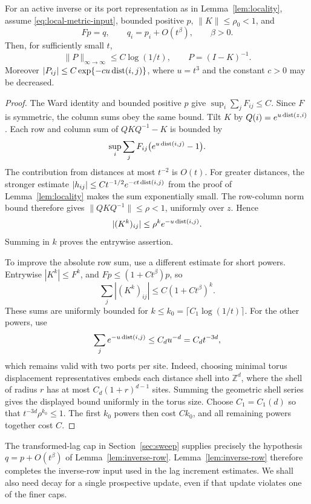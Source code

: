 \begin{lemma}\label{lem:inverse-row}
For an active inverse or its port representation as in
Lemma~\ref{lem:locality}, assume \eqref{eq:local-metric-input}, bounded positive \(p\),
\(\|K\|\le\rho_0<1\), and
\[
 Fp=q,\qquad q_i=p_i+O(t^\beta),\qquad \beta>0.
\]
Then, for sufficiently small \(t\),
\begin{equation}\label{eq:local-p-row}
 \|P\|_{\infty\to\infty}\le C\log(1/t),
 \qquad P=(I-K)^{-1}.
\end{equation}
Moreover \(|P_{ij}|\le C\exp\{-cu\operatorname{dist}(i,j)\}\), where \(u=t^3\)
and the constant \(c>0\) may be decreased.
\end{lemma}

\begin{proof}
The Ward identity and bounded positive \(p\) give
\(\sup_i\sum_jF_{ij}\le C\).  Since \(F\) is symmetric, the column
sums obey the same bound.  Tilt \(K\) by
\(Q(i)=e^{u\operatorname{dist}(z,i)}\).  Each row and column sum of
\(QKQ^{-1}-K\) is bounded by
\[
 \sup_i\sum_jF_{ij}\big(e^{u\operatorname{dist}(i,j)}-1\big).
\]
The contribution from distances at most \(t^{-2}\) is \(O(t)\).
For greater distances, the stronger estimate
\(|h_{ij}|\le Ct^{-1/2}e^{-ct\operatorname{dist}(i,j)}\) from the proof of
Lemma~\ref{lem:locality} makes the sum exponentially small.  The
row-column norm bound therefore gives
\(\|QKQ^{-1}\|\le\rho<1\), uniformly over \(z\).
Hence
\[
 |(K^k)_{ij}|\le\rho^k e^{-u\operatorname{dist}(i,j)}.
\]
Summing in \(k\) proves the entrywise assertion.

To improve the absolute row sum, use a different estimate for short
powers.  Entrywise \(|K^k|\le F^k\), and
\(Fp\le(1+Ct^\beta)p\), so
\[
 \sum_j|(K^k)_{ij}|\le C(1+Ct^\beta)^k.
\]
These sums are uniformly bounded for
\(k\le k_0=\lceil C_1\log(1/t)\rceil\).  For the other powers, use
\[
 \sum_j e^{-u\operatorname{dist}(i,j)}\le C_d u^{-d}=C_d t^{-3d},
\]
which remains valid with two ports per site.  Indeed, choosing minimal
torus displacement representatives embeds each distance shell into
\(\mathbb Z^d\), where the shell of radius \(r\) has at most
\(C_d(1+r)^{d-1}\) sites.  Summing the geometric shell series gives
the displayed bound uniformly in the torus size.  Choose \(C_1=C_1(d)\)
so that \(t^{-3d}\rho^{k_0}\le1\).  The first \(k_0\) powers then cost \(Ck_0\),
and all remaining powers together cost \(C\).
\end{proof}

The transformed-lag cap in Section~\ref{sec:sweep} supplies precisely the hypothesis
\(q=p+O(t^\beta)\) of Lemma~\ref{lem:inverse-row}.  Lemma~\ref{lem:inverse-row} therefore
completes the inverse-row input used in the lag increment estimates.
We shall also need decay for a single prospective update, even if that
update violates one of the finer caps.

